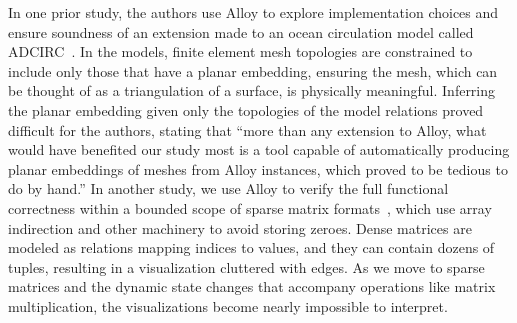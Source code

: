 \documentclass[runningheads]{llncs}
\begin{document}


In one prior study, the authors use Alloy to explore implementation choices and ensure soundness of an extension made to an ocean circulation model called ADCIRC~\cite{baugh-scp-2018}.
In the models, finite element mesh topologies are constrained to include only those that have a planar embedding, ensuring the mesh, which can be thought of as a triangulation of a surface, is physically meaningful. 
Inferring the planar embedding given only the topologies of the model relations proved difficult for the authors, stating that ``more than any extension to Alloy, what would have benefited our study most is a tool capable of automatically producing planar embeddings of meshes from Alloy instances, which proved to be tedious to do by hand.''
In another study, we use Alloy to verify the full functional correctness within a bounded scope of sparse matrix formats~\cite{dyer2019}, which use array indirection and other machinery to avoid storing zeroes.
Dense matrices are modeled as relations mapping indices to values, and they can contain dozens of tuples, resulting in a visualization cluttered with edges.
As we move to sparse matrices and the dynamic state changes that accompany operations like matrix multiplication, the visualizations become nearly impossible to interpret.
\end{document}
